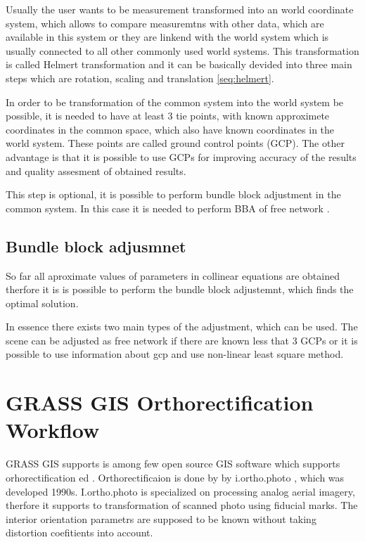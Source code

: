 \documentclass[a4paper,12pt]{report}
\begin{document}
\begin{itemize}
Usually the user wants to be measurement transformed into an world coordinate system, which allows 
to compare measuremtns with other data, which are available in this system or they are 
linkend with the world system which is usually connected to all other commonly used  world systems. 
This transformation is called Helmert  transformation and it can be basically devided into 
three main steps which are rotation, scaling and translation \ref{seq:helmert}.

In order to be transformation of the common system into the world system be possible, it is needed 
to have at least 3 tie points, with known approximete coordinates in the common space, which also have 
known coordinates in the world system. These points are called ground control points (GCP). The other advantage is that it is possible to use GCPs for improving accuracy of the results and 
 quality assesment of obtained results.
 
This step is optional, it is possible to perform bundle block adjustment in the common system. In this 
case it is needed to perform BBA of free network \label{sec:free_net_least}. 
 
 
\subsection{Bundle block adjusmnet}

So far all aproximate values of parameters in collinear equations are obtained therfore it 
is is possible to perform the bundle block adjustemnt, which finds the optimal solution.

In essence there exists two main types of the adjustment, which can be used. The scene 
can be adjusted as free network if there are known less that 3 GCPs or it is possible 
to use information about gcp and use non-linear least square method.

\section{GRASS GIS Orthorectification Workflow}

GRASS GIS supports is among few open source GIS software which supports orhorectification ed
\cite{rocchini2012robust}. Orthorectificaion is done by 
by i.ortho.photo \cite{i.ortho.photo}, which was developed 1990s.
I.ortho.photo is specialized on processing analog aerial imagery, therfore 
it supports to transformation of scanned photo using fiducial marks. 
The interior orientation parametrs are supposed to be known without taking distortion 
coefitients into account. 


\end{itemize}
\end{document}
